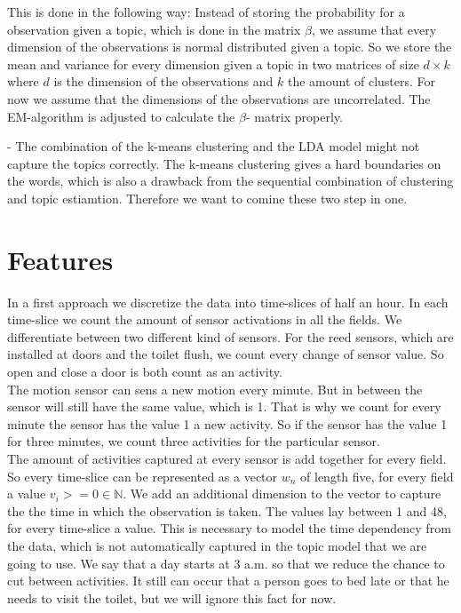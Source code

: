 \documentclass[11pt,a4paper]{article}
\begin{document}
  This is done in the following way:
Instead of storing the probability for a observation given a topic, which is done in the matrix $\beta$, we assume that every dimension of the observations is normal distributed given a topic. So we store the mean and variance for every dimension given a topic in two matrices of size $d \times k$ where $d$ is the dimension of the observations and $k$ the amount of clusters. For now we assume that the dimensions of the observations are uncorrelated. The EM-algorithm is adjusted to calculate the $\beta$- matrix properly.

- The combination of the k-means clustering and the LDA model might not capture the topics correctly. The k-means clustering gives a hard boundaries on the words, which is also a drawback from the sequential combination of clustering and topic estiamtion. Therefore we want to comine these two step in one.




\section{Features}
\label{sec:features}
In a first approach we discretize the data into time-slices of half an hour. In each time-slice we count the amount of sensor activations in all the fields. We differentiate between two different kind of sensors. For the reed sensors, which are installed at doors and the toilet flush, we count every change of sensor value. So open and close a door is both count as an activity.\\
The motion sensor can sens a new motion every minute. But in between the sensor will still have the same value, which is 1. That is why we count for every minute the sensor has the value 1 a new activity. So if the sensor has the value 1 for three minutes, we count three activities for the particular sensor.\\
The amount of activities captured at every sensor is add together for every field. So every time-slice can be represented as a vector $w_n$ of length five, for every field a value $v_i>=0 \in \mathbb{N}$. We add an additional dimension to the vector to capture the the time in which the observation is taken. The values lay between 1 and 48, for every time-slice a value. This is necessary to model the time dependency from the data, which is not automatically captured in the topic model that we are going to use. We say that a day starts at 3 a.m. so that we reduce the chance to cut between activities. It still can occur that a person goes to bed late or that he needs to visit the toilet, but we will ignore this fact for now.
\end{document}
